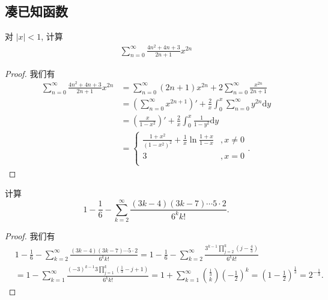 \documentclass[../../main.tex]{subfiles}%
\begin{document}
\subsection{凑已知函数}

\begin{example}
对 \(|x| < 1\), 计算
\begin{align*}
\sum_{n=0}^{\infty} \frac{4n^2 + 4n + 3}{2n + 1} x^{2n}
\end{align*}
\end{example}
\begin{proof}

我们有
\begin{align*}
\sum_{n=0}^{\infty} \frac{4n^2 + 4n + 3}{2n + 1} x^{2n} &= \sum_{n=0}^{\infty} (2n + 1) x^{2n} + 2 \sum_{n=0}^{\infty} \frac{x^{2n}}{2n + 1} \\
&= \left( \sum_{n=0}^{\infty} x^{2n + 1} \right)' + \frac{2}{x} \int_{0}^{x} \sum_{n=0}^{\infty} y^{2n} \mathrm{d}y \\
&= \left( \frac{x}{1 - x^2} \right)' + \frac{2}{x} \int_{0}^{x} \frac{1}{1 - y^2} \mathrm{d}y \\
&=\begin{cases}
\frac{1+x^2}{(1-x^2)^2}+\frac{1}{x}\ln \frac{1+x}{1-x}&,x\ne 0\\
3&,x=0\\
\end{cases}.
\end{align*}

\end{proof}

\begin{example}
计算
\[
1 - \frac{1}{6} - \sum_{k=2}^{\infty} \frac{(3k - 4)(3k - 7) \cdots 5 \cdot 2}{6^k k!}.
\]
\end{example}
\begin{proof}

我们有
\begin{align*}
&1 - \frac{1}{6} - \sum_{k=2}^{\infty} \frac{(3k - 4)(3k - 7) \cdots 5 \cdot 2}{6^k k!}= 1 - \frac{1}{6} - \sum_{k=2}^{\infty} \frac{3^{k - 1} \prod\limits_{j=2}^{k} \left(j - \frac{4}{3}\right)}{6^k k!}\\
&= 1 - \sum_{k=1}^{\infty} \frac{(-3)^{k - 1} 3 \prod\limits_{j=1}^{k} \left(\frac{1}{3} - j + 1\right)}{6^k k!}= 1 + \sum_{k=1}^{\infty} \binom{\frac{1}{3}}{k} \left(-\frac{1}{2}\right)^k = \left(1 - \frac{1}{2}\right)^{\frac{1}{3}} = 2^{-\frac{1}{3}}.
\end{align*}

\end{proof}
\end{document}

